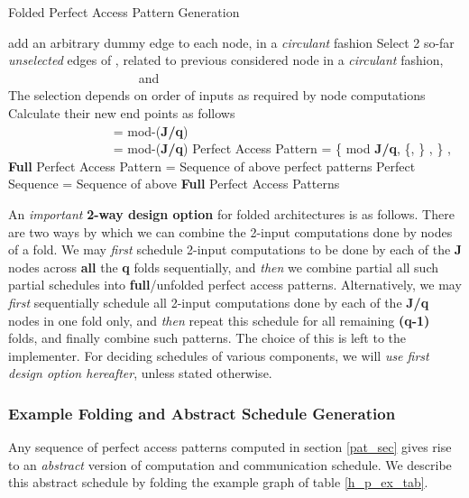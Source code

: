 \documentclass[12pt]{article}
\begin{document}
\begin{algorithm}[h]
        \caption{Folded Perfect Access Pattern Generation}
\label{alg1}
\begin{algorithmic}[0]
    \State add an arbitrary dummy edge to each node, in a
    \textit{circulant} fashion
\EndIf
\Statex
{}
        \State Select 2 so-far \textit{unselected} edges of , related to previous
    considered node in a \textit{circulant} fashion, \\
    ~~~~~~~~~~~~~~~~~~~~ and  \\
            \Comment The selection depends on order of inputs as required by node computations
        \State Calculate their new end points as follows\\
    ~~~~~~~~~~~~~~~~  =  mod-(\textbf{J/q}) \\
    ~~~~~~~~~~~~~~~~  =
     mod-(\textbf{J/q})
      \EndFor
      \Statex
      \State Perfect Access Pattern = \{ 
       mod \textbf{J/q}, \{, 
\} ,  \}  , 
    \EndFor
    \Statex
    \State \textbf{Full} Perfect Access Pattern = Sequence of above perfect
    patterns  
\EndWhile
\Statex
\State Perfect Sequence = Sequence of above \textbf{Full} Perfect Access Patterns
\end{algorithmic}
\end{algorithm}

An \textit{important} \textbf{2-way design option} for folded architectures
is as follows. There are two ways by which we can combine the 2-input 
computations done by nodes of a fold. We may \textit{first} schedule
2-input computations to be done by each of the
\textbf{J} nodes across \textbf{all} the \textbf{q}
folds sequentially, and \textit{then} we combine partial
all such partial schedules into \textbf{full}/unfolded perfect access patterns.
Alternatively, we may \textit{first} sequentially schedule all
 2-input computations done by each of
the \textbf{J/q} nodes in one fold only, and \textit{then}
repeat this schedule
for all remaining \textbf{(q-1)} folds, and finally combine such
patterns. The choice of
this is left to the implementer. For deciding schedules of various
components, we will \textit{use first design option hereafter}, unless stated
otherwise.

\subsubsection{Example Folding and Abstract Schedule Generation}
\label{abs_sched_sec}
Any sequence of perfect access patterns computed in section \ref{pat_sec}
gives rise to an \textit{abstract} version of computation and communication
schedule. We describe this abstract schedule by folding the example graph
of table \ref{h_p_ex_tab}.
\end{document}
